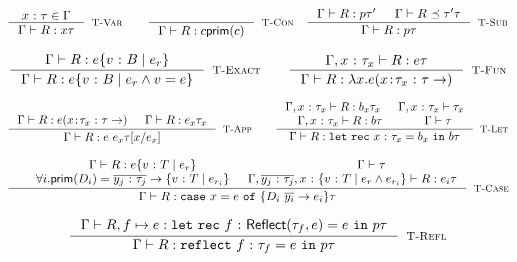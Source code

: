 \hfill{\fbox{\hastype{\env}{\RRenv}{\prog}{\typ}}}\\
$$
\inference{
	\tbind{x}{\gtyp}\in\env
}{
	\hastype{\env}{\RRenv}{x}{\gtyp}
}[\rtvar]
\qquad
\inference{
}{
	\hastype{\env}{\RRenv}{c}{\constty{c}}
}[\rtconst]
\quad
\inference{
	\hastype{\env}{\RRenv}{\prog}{\typ'} &
	\issubtype{\env}{\RRenv}{\typ'}{\typ}
}{
	\hastype{\env}{\RRenv}{\prog}{\typ}
}[\rtsub]
$$

$$
\inference{
	\hastype{\env}{\RRenv}{e}{\tref{v}{\btyp}{e_r}}
}{
	\hastype{\env}{\RRenv}{e}{\tref{v}{\btyp}{e_r\land v = e}}
}[\rtexact]
\qquad
\inference{
	\hastype{\env, \tbind{x}{\typ_x}}{\RRenv}{e}{\typ}
}{
	\hastype{\env}{\RRenv}{\efun{x}{\typ}{e}}{(\trfun{x}{\typ_x}{\typ})}
}[\rtfun]
$$

$$
\inference{
	\hastype{\env}{\RRenv}{e}{(\trfun{x}{\typ_x}{\typ})} &&
	\hastype{\env}{\RRenv}{e_x}{\typ_x}
}{
	\hastype{\env}{\RRenv}{e\ e_x}{\typ\subst{x}{e_x}}
}[\rtapp]
\qquad
\inference
	{\hastype{\env, \tbind{x}{\gtyp_x}}{\RRenv}{\bd_x}{\gtyp_x} &
	 \iswellformed{\env, \tbind{x}{\gtyp_x}}{\typ_x} \\
	 \hastype{\env, \tbind{x}{\gtyp_x}}{\RRenv}{\bd}{\gtyp} &
	 \iswellformed{\env}{\typ}}
	{\hastype{\env}{\RRenv}{\eletb{x}{\gtyp_x}{\bd_x}{\bd}}{\typ}}
	[\rtlet]
$$

$$
\inference{
	\hastype{\env}{\RRenv}{e}{\tref{v}{T}{e_r}} & \iswellformed{\env}{\typ} \\
	& \forall i. \constty{\dc_i} = \tfunbasic{\overline{\tbind{y_j}{\typ_j}}}{\tref{v}{T}{e_{r_i}}} 
	& \hastype{\env, \overline{\tbind{y_j}{\typ_j}}, \tbind{x}{\tref{v}{T}{e_r \land e_{r_i}}} }{\RRenv}{e_i}{\typ}
}{
	\hastype{\env}{\RRenv}{\ecase{x}{e}{\dc_i}{\overline{y_i}}{e_i}}{\typ}
}[\rtcase]
$$

$$
\inference
	{\hastype{\env}{\RRenv, f \mapsto e}
	 				 {\eletb{f}{\exacttype{\gtyp_f}{e}}{e}{\prog}}
					 {\typ}
	}
	{\hastype{\env}{\RRenv}
					 {\erefb{f}{\gtyp_f}{e}{\prog}}
					 {\typ}
	}[\rtreflect]
$$

